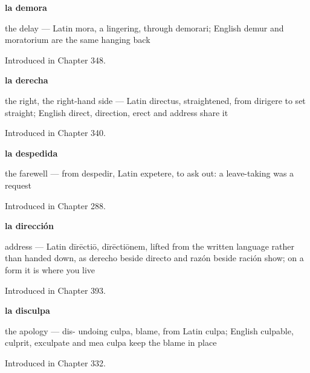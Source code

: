 \noindent\begin{minipage}[t]{\linewidth}
\raggedright
\textbf{la demora}\par
\small the delay — Latin mora, a lingering, through demorari; English demur and moratorium are the same hanging back\par
\footnotesize Introduced in Chapter 348.
\end{minipage}\par\medskip

\noindent\begin{minipage}[t]{\linewidth}
\raggedright
\textbf{la derecha}\par
\small the right, the right-hand side — Latin directus, straightened, from dirigere to set straight; English direct, direction, erect and address share it\par
\footnotesize Introduced in Chapter 340.
\end{minipage}\par\medskip

\noindent\begin{minipage}[t]{\linewidth}
\raggedright
\textbf{la despedida}\par
\small the farewell — from despedir, Latin expetere, to ask out: a leave-taking was a request\par
\footnotesize Introduced in Chapter 288.
\end{minipage}\par\medskip

\noindent\begin{minipage}[t]{\linewidth}
\raggedright
\textbf{la dirección}\par
\small address — Latin dīrēctiō, dīrēctiōnem, lifted from the written language rather than handed down, as derecho beside directo and razón beside ración show; on a form it is where you live\par
\footnotesize Introduced in Chapter 393.
\end{minipage}\par\medskip

\noindent\begin{minipage}[t]{\linewidth}
\raggedright
\textbf{la disculpa}\par
\small the apology — dis- undoing culpa, blame, from Latin culpa; English culpable, culprit, exculpate and mea culpa keep the blame in place\par
\footnotesize Introduced in Chapter 332.
\end{minipage}\par\medskip

